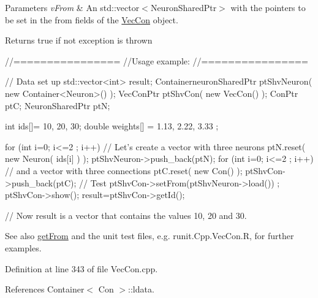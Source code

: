 \begin{DoxyParams}{Parameters}
{\em vFrom} & An std::vector$<$NeuronSharedPtr$>$ with the pointers to be set in the from fields of the \hyperlink{classvec_con}{VecCon} object.\\
\hline
\end{DoxyParams}
\begin{DoxyReturn}{Returns}
true if not exception is thrown
\end{DoxyReturn}

\begin{DoxyCode}
        //================
        //Usage example:
        //================

        // Data set up
                std::vector<int> result;
                ContainerneuronSharedPtr ptShvNeuron( new Container<Neuron>() );
                VecConPtr ptShvCon( new VecCon() );
                ConPtr    ptC;
                NeuronSharedPtr ptN;

                int ids[]= {10, 20, 30};
                double weights[] = {1.13, 2.22, 3.33 };

                for (int i=0; i<=2 ; i++) {                             // Let's 
      create a vector with three neurons
                        ptN.reset( new Neuron( ids[i] ) );
                        ptShvNeuron->push_back(ptN);
                }
                for (int i=0; i<=2 ; i++) {                             // and a 
      vector with three connections
                        ptC.reset( new Con() );
                        ptShvCon->push_back(ptC);
                }
        // Test
                ptShvCon->setFrom(ptShvNeuron->load()) ;
                ptShvCon->show();
                result=ptShvCon->getId();

        // Now result is a vector that contains the values 10, 20 and 30.
\end{DoxyCode}


\begin{DoxySeeAlso}{See also}
\hyperlink{classvec_con_ae72d00aedcd054e690f1dcf2ca5ac2c2}{getFrom} and the unit test files, e.g. runit.Cpp.VecCon.R, for further examples. 
\end{DoxySeeAlso}


Definition at line 343 of file VecCon.cpp.



References Container$<$ Con $>$::ldata.


